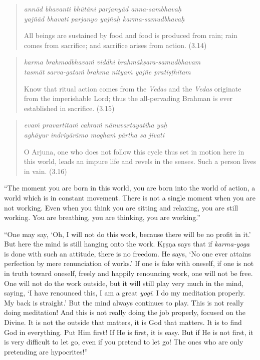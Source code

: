 \documentclass[12pt, twoside, openright]{memoir}
\begin{document}
\par
\begin{verse}
\textit{annād bhavanti bhūtāni parjanyād anna-sambhavaḥ} \\
\textit{yajñād bhavati parjanyo yajñaḥ karma-samudbhavaḥ}

\noindent All beings are sustained by food and food is produced from rain; rain comes from sacrifice; and sacrifice arises from action. (3.14)
\end{verse}
\par



\par
\begin{verse}
\textit{karma brahmodbhavaṁ viddhi brahmākṣara-samudbhavam} \\
\textit{tasmāt sarva-gataṁ brahma nityaṁ yajñe pratiṣṭhitam}

\noindent Know that ritual action comes from the \textit{Vedas} and the \textit{Vedas} originate from the imperishable Lord; thus the all-pervading Brahman is ever established in sacrifice. (3.15)
\end{verse}
\par



\par
\begin{verse}
\textit{evaṁ pravartitaṁ cakraṁ nānuvartayatīha yaḥ} \\
\textit{aghāyur indriyārāmo moghaṁ pārtha sa jīvati}

\noindent O Arjuna, one who does not follow this cycle thus set in motion here in this world, leads an impure life and revels in the senses. Such a person lives in vain. (3.16)
\end{verse}
\par


\enquote{The moment you are born in this world, you are born into the world of action, a world which is in constant movement. There is not a single moment when you are not working. Even when you think you are sitting and relaxing, you are still working. You are breathing, you are thinking, you are working.}

\enquote{One may say, \enquote{Oh, I will not do this work, because there will be no profit in it.} But here the mind is still hanging onto the work. Kṛṣṇa says that if \textit{karma-yoga} is done with such an attitude, there is no freedom. He says, \enquote{No one ever attains perfection by mere renunciation of works.} If one is fake with oneself, if one is not in truth toward oneself, freely and happily renouncing work, one will not be free. One will not do the work outside, but it will still play very much in the mind, saying, \enquote{I have renounced this, I am a great \textit{yogī}. I do my meditation properly. My back is straight.} But the mind always continues to play. This is not really doing meditation! And this is not really doing the job properly, focused on the Divine. It is not the outside that matters, it is God that matters. It is to find God in everything. Put Him first! If He is first, it is easy. But if He is not first, it is very difficult to let go, even if you pretend to let go! The ones who are only pretending are hypocrites!}
\end{document}
